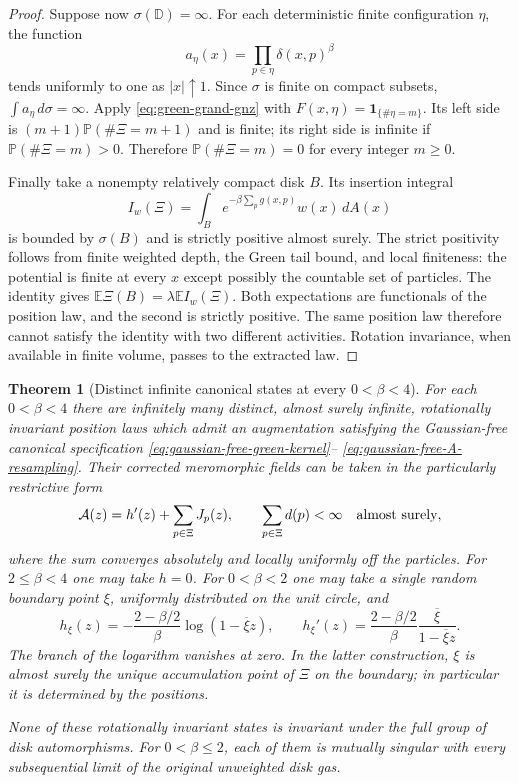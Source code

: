 \documentclass[11pt,a4paper]{article}
\numberwithin{equation}{section}
\newtheorem{theorem}{Theorem}[section]
\theoremstyle{definition}
\theoremstyle{remark}
\newcommand{\D}{\mathbb D}
\begin{document}
\begin{proof}
Suppose now $\sigma(\D)=\infty$.  For each deterministic finite
configuration $\eta$, the function
\[
 a_\eta(x)=\prod_{p\in\eta}\delta(x,p)^\beta
\]
tends uniformly to one as $|x|\uparrow1$.  Since $\sigma$ is finite on
compact subsets, $\int a_\eta\,d\sigma=\infty$.  Apply
\eqref{eq:green-grand-gnz} with
$F(x,\eta)=\mathbf1_{\{\#\eta=m\}}$.  Its left side is
$(m+1)\mathbb P(\#\Xi=m+1)$ and is finite; its right side is infinite
if $\mathbb P(\#\Xi=m)>0$.  Therefore
$\mathbb P(\#\Xi=m)=0$ for every integer $m\ge0$.

Finally take a nonempty relatively compact disk $B$.  Its insertion
integral
\[
 I_w(\Xi)=\int_B e^{-\beta\sum_pg(x,p)}w(x)\,dA(x)
\]
is bounded by $\sigma(B)$ and is strictly positive almost surely.
The strict positivity follows from finite weighted depth, the Green tail
bound, and local finiteness: the potential is finite at every $x$ except
possibly the countable set of particles.  The identity gives
$\mathbb E\Xi(B)=\lambda\mathbb EI_w(\Xi)$.  Both expectations are
functionals of the position law, and the second is strictly positive.
The same position law therefore cannot satisfy the identity with two
different activities.  Rotation invariance, when available in finite
volume, passes to the extracted law.
\end{proof}

\begin{theorem}[Distinct infinite canonical states at every $0<\beta<4$]
\label{thm:infinite-green-canonical-nonuniqueness}
For each $0<\beta<4$ there are infinitely many distinct, almost surely
infinite, rotationally invariant position laws which admit an augmentation
satisfying the Gaussian-free canonical specification
\eqref{eq:gaussian-free-green-kernel}--
\eqref{eq:gaussian-free-A-resampling}.  Their corrected meromorphic fields
can be taken in the particularly restrictive form
\begin{equation}\label{eq:infinite-green-absolutely-summed-field}
 \mathcal A(z)=h'(z)+\sum_{p\in\Xi}J_p(z),
 \qquad \sum_{p\in\Xi}d(p)<\infty\quad\hbox{almost surely},
\end{equation}
where the sum converges absolutely and locally uniformly off the particles.
For $2\le\beta<4$ one may take $h=0$.  For $0<\beta<2$ one may take a
single random boundary point $\xi$, uniformly distributed on the unit
circle, and
\begin{equation}\label{eq:infinite-green-boundary-pole}
 h_\xi(z)=-\frac{2-\beta/2}{\beta}\log(1-\overline\xi z),
 \qquad
 h_\xi'(z)=\frac{2-\beta/2}{\beta}
                   \frac{\overline\xi}{1-\overline\xi z}.
\end{equation}
The branch of the logarithm vanishes at zero.  In the latter construction,
$\xi$ is almost surely the unique accumulation point of $\Xi$ on the
boundary; in particular it is determined by the positions.

None of these rotationally invariant states is invariant under the full
group of disk automorphisms.  For $0<\beta\le2$, each of them is mutually singular with every
subsequential limit of the original unweighted disk gas.
\end{theorem}
\end{document}
